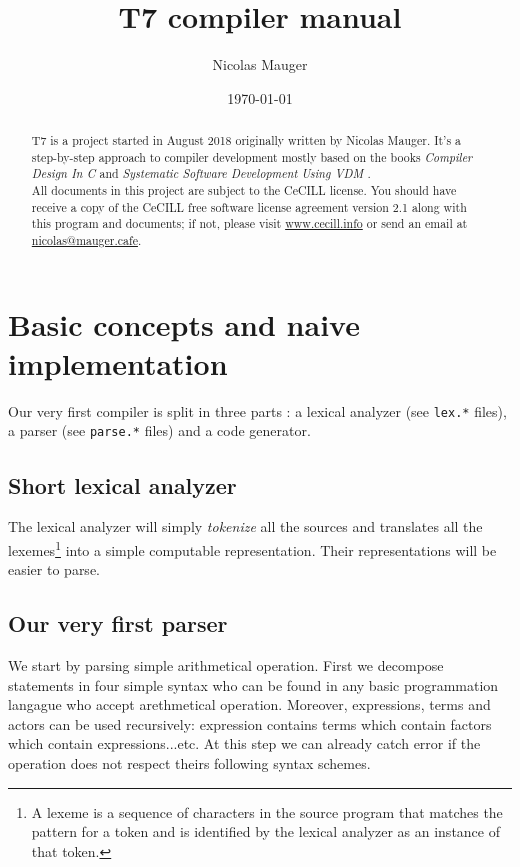 \documentclass{article}
\title{T7 compiler manual}
\author{Nicolas Mauger}
\date{\today}
\begin{document}
    \maketitle

    \newpage

    \begin{abstract}
	    T7 is a project started in August 2018 originally written by Nicolas Mauger.
	    It's a step-by-step approach to compiler development mostly based on the books
	    \textit{Compiler Design In C \cite{CompilerDesignInC}} and \textit{Systematic Software
	    Development Using VDM \cite{VDMdevelopment}}. \\
	    All documents in this project are subject to the CeCILL license. You should have receive a
	    copy of the CeCILL free software license agreement version 2.1 along with this program and
	    documents; if not, please visit
	    \href{http://www.cecill.info/licences/Licence_CeCILL_V2.1-en.txt}{www.cecill.info} or send
	    an email at \href{mailto:nicolas@mauger.cafe}{nicolas@mauger.cafe}.
    \end{abstract}

    \tableofcontents

        \section{Basic concepts and naive implementation}
        Our very first compiler is split in three parts : a lexical analyzer (see \texttt{lex.*}
        files), a parser (see \texttt{parse.*} files) and a code generator.

            \subsection{Short lexical analyzer}
            The lexical analyzer will simply \textit{tokenize} all the sources and translates all
            the lexemes\footnote{A lexeme is a sequence of characters in the source program that
            matches the pattern for a token and is identified by the lexical analyzer as an instance
            of that token.} into a simple computable representation. Their representations will be
            easier to parse.

            \subsection{Our very first parser}
            We start by parsing simple arithmetical operation. First we decompose statements in four
            simple syntax who can be found in any basic programmation langague who accept
            arethmetical operation. Moreover, expressions, terms and actors can be used recursively:
            expression contains terms which contain factors which contain expressions...etc. At this
            step we can already catch error if the operation does not respect theirs following
            syntax schemes.
\end{document}
